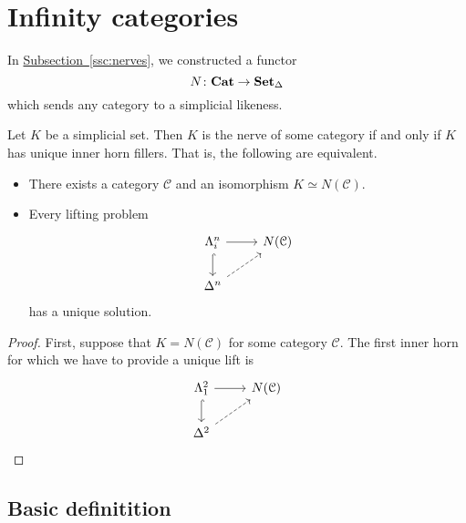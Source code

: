 \documentclass[main.tex]{subfiles}
\begin{document}
\newcommand{\ssmash}{\overset{\star}{\wedge}}

\chapter{Infinity categories}
\label{ch:infinity_categories}

In \hyperref[ssc:nerves]{Subsection~\ref*{ssc:nerves}}, we constructed a functor
\begin{equation*}
  N\colon \mathbf{Cat} \to \operatorname{\mathbf{Set}_{\Delta}}
\end{equation*}
which sends any category to a simplicial likeness.

\begin{lemma}
  Let $K$ be a simplicial set. Then $K$ is the nerve of some category if and only if $K$ has unique inner horn fillers. That is, the following are equivalent.
  \begin{itemize}
    \item There exists a category $\mathcal{C}$ and an isomorphism $K \simeq N(\mathcal{C})$.

    \item Every lifting problem
      \begin{equation*}
        \begin{tikzcd}
          \Lambda^{n}_{i}
          \arrow[r]
          \arrow[d, hookrightarrow]
          & N(\mathcal{C})
          \\
          \Delta^{n}
          \arrow[ur, dashed]
        \end{tikzcd}
      \end{equation*}
      has a unique solution.
  \end{itemize}
\end{lemma}
\begin{proof}
  First, suppose that $K = N(\mathcal{C})$ for some category $\mathcal{C}$. The first inner horn for which we have to provide a unique lift is
  \begin{equation*}
    \begin{tikzcd}
      \Lambda^{2}_{1}
      \arrow[r]
      \arrow[d, hook]
      & N(\mathcal{C})
      \\
      \Delta^{2}
      \arrow[ur, dashed]
    \end{tikzcd}
  \end{equation*}
\end{proof}

\section{Basic definitition}
\label{sec:basic_definitions_infinity_categories}
\end{document}
